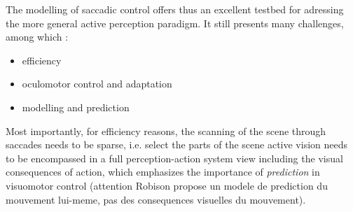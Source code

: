 \documentclass[12pt,twoside,openright]{article}
\begin{document}
	The modelling of saccadic control offers thus an excellent testbed for adressing the more general active perception paradigm. It still presents many challenges, among which :
	\begin{itemize}
		\item efficiency
		\item oculomotor control and adaptation
		\item modelling and prediction
	\end{itemize}
	
	{\color{blue} Most importantly, for efficiency reasons, the scanning of the scene through saccades needs to be sparse, i.e. select the parts of the scene
	active vision needs to be encompassed in a full perception-action system view including the visual consequences of action, which emphasizes the importance of \emph{prediction} in visuomotor control \cite{Robinson1975, berthoz1996neural} (attention Robison propose un modele de prediction du mouvement lui-meme, pas des consequences visuelles du mouvement).}
\end{document}
